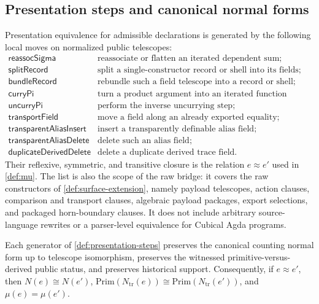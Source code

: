 \documentclass{lmcs}
\newcommand{\Prim}{\mathrm{Prim}}
\begin{document}
\subsection{Presentation steps and canonical normal forms}

\begin{defi}
\label{def:presentation-steps}
Presentation equivalence for admissible declarations is generated by the following local moves on normalized public telescopes:
\[
\begin{array}{ll}
  \mathsf{reassocSigma}              & \text{reassociate or flatten an iterated dependent sum;}\\
  \mathsf{splitRecord}               & \text{split a single-constructor record or shell into its fields;}\\
  \mathsf{bundleRecord}              & \text{rebundle such a field telescope into a record or shell;}\\
  \mathsf{curryPi}                   & \text{turn a product argument into an iterated function telescope;}\\
  \mathsf{uncurryPi}                 & \text{perform the inverse uncurrying step;}\\
  \mathsf{transportField}            & \text{move a field along an already exported equality;}\\
  \mathsf{transparentAliasInsert}    & \text{insert a transparently definable alias field;}\\
  \mathsf{transparentAliasDelete}    & \text{delete such an alias field;}\\
  \mathsf{duplicateDerivedDelete}    & \text{delete a duplicate derived trace field.}
\end{array}
\]
Their reflexive, symmetric, and transitive closure is the relation $e\approx e'$ used in \autoref{def:mu}. The list is also the scope of the raw bridge: it covers the raw constructors of \autoref{def:surface-extension}, namely payload telescopes, action clauses, comparison and transport clauses, algebraic payload packages, export selections, and packaged horn-boundary clauses. It does not include arbitrary source-language rewrites or a parser-level equivalence for Cubical Agda programs.
\end{defi}

\begin{prop}
\label{prop:normal-form-stability}
Each generator of \autoref{def:presentation-steps} preserves the canonical counting normal form up to telescope isomorphism, preserves the witnessed primitive-versus-derived public status, and preserves historical support. Consequently, if $e\approx e'$, then $N(e)\cong N(e')$, $\Prim(N_{\mathrm{tr}}(e))\cong \Prim(N_{\mathrm{tr}}(e'))$, and $\mu(e)=\mu(e')$.
\end{prop}
\end{document}
